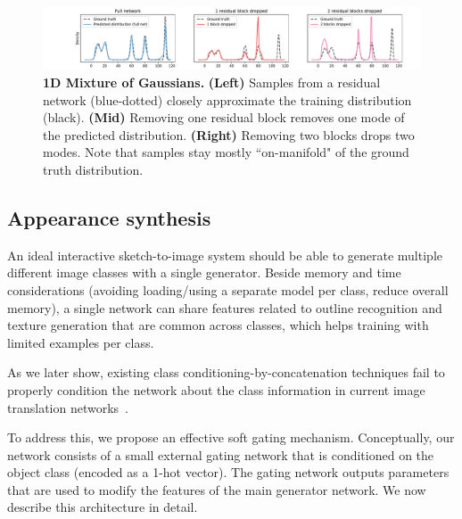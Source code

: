 \begin{figure}[t]
    \centering
    \includegraphics[width=\linewidth,trim={2.6cm 0 1.8cm 0},clip]{paper_images/mog.pdf}
    \caption{{\bf 1D Mixture of Gaussians.} {\bf (Left)} Samples from a residual network (blue-dotted) closely approximate the training distribution (black). {\bf (Mid)} Removing one residual block removes one mode of the predicted distribution. {\bf (Right)} Removing two blocks drops two modes. Note that samples stay mostly ``on-manifold" of the ground truth distribution.
    }\label{fig:onedexperiment}
\end{figure}

\subsection{Appearance synthesis}
An ideal interactive sketch-to-image system  should be able to generate multiple different image classes with a single generator. 
Beside memory and time considerations (avoiding loading/using a separate model per class, reduce overall memory), a single network can share features related to outline recognition and texture generation that are common across classes, which helps training with limited examples per class. 

As we later show, existing class conditioning-by-concatenation techniques fail to properly condition the network about the class information in current image translation networks~\cite{isola2016image2image,zhu2017toward}.

To address this, we propose an effective soft gating mechanism.
Conceptually, our network consists of a small external gating network that is conditioned on the object class (encoded as a 1-hot vector).
The gating network outputs parameters that are used to modify the features of the main generator network.
We now describe this architecture in detail.



